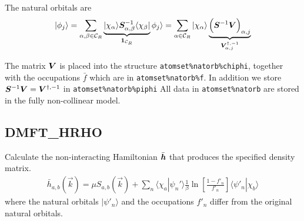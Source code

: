 \documentclass[11pt,a4paper]{report}
\begin{document}
The natural orbitals are
\begin{eqnarray}
|\phi_j\rangle=\sum_{\alpha,\beta\in\mathcal{C}_R}
\underbrace{|\chi_\alpha\rangle
\bm{S}^{-1}_{\alpha,\beta}\langle\chi_\beta|}_{\bm{1}_{\mathcal{C}_R}}
\phi_j\rangle
=\sum_{\alpha\in\mathcal{C}_R}|\chi_\alpha\rangle
\underbrace{\Bigl(\bm{S}^{-1}\bm{V}\Bigr)_{\alpha,j}}_{\bm{V}^{\dagger,-1}_{\alpha,j}}
\end{eqnarray}

The matrix $\bm{V}$ is placed into the structure
\verb|atomset%natorb%chiphi|, together with the occupations $\bar{f}$
which are in \verb|atomset%natorb%f|. In addition we store
$\bm{S}^{-1}\bm{V}=\bm{V}^{\dagger,-1}$ in
\verb|atomset%natorb%piphi| All data in \verb|atomset%natorb| are
stored in the fully non-collinear model.

\subsection{DMFT\_HRHO}
\label{sec:routinedmfthrho}
Calculate the non-interacting Hamiltonian $\bar{\bm{h}}$ that
produces the specified density matrix.
\begin{eqnarray}
\bar{h}_{a,b}(\vec{k})=\mu S_{a,b}(\vec{k})+\sum_n\langle\chi_a|\psi_n'\rangle
\frac{1}{\beta}\ln\left[\frac{1-f'_n}{f'_n}\right]
\langle\psi'_n|\chi_b\rangle
\end{eqnarray}
where the natural orbitals $|\psi'_n\rangle$ and the occupations
$f'_n$ differ from the original natural orbitals.
\end{document}
